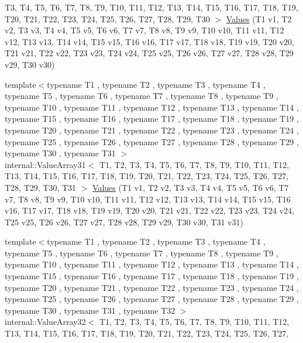 \begin{DoxyCompactItemize}
\-T3, \-T4, \-T5, \-T6, \-T7, \-T8, \-T9, \*
\-T10, \-T11, \-T12, \-T13, \-T14, \-T15, \*
\-T16, \-T17, \-T18, \-T19, \-T20, \-T21, \*
\-T22, \-T23, \-T24, \-T25, \-T26, \-T27, \*
\-T28, \-T29, \-T30 $>$ \hyperlink{namespacetesting_a016767be70ad0412bdbf837bc4d3ca98}{\-Values} (\-T1 v1, \-T2 v2, \-T3 v3, \-T4 v4, \-T5 v5, \-T6 v6, \-T7 v7, \-T8 v8, \-T9 v9, \-T10 v10, \-T11 v11, \-T12 v12, \-T13 v13, \-T14 v14, \-T15 v15, \-T16 v16, \-T17 v17, \-T18 v18, \-T19 v19, \-T20 v20, \-T21 v21, \-T22 v22, \-T23 v23, \-T24 v24, \-T25 v25, \-T26 v26, \-T27 v27, \-T28 v28, \-T29 v29, \-T30 v30)
\item 
{\footnotesize template$<$typename T1 , typename T2 , typename T3 , typename T4 , typename T5 , typename T6 , typename T7 , typename T8 , typename T9 , typename T10 , typename T11 , typename T12 , typename T13 , typename T14 , typename T15 , typename T16 , typename T17 , typename T18 , typename T19 , typename T20 , typename T21 , typename T22 , typename T23 , typename T24 , typename T25 , typename T26 , typename T27 , typename T28 , typename T29 , typename T30 , typename T31 $>$ }\\internal\-::\-Value\-Array31$<$ \-T1, \-T2, \*
\-T3, \-T4, \-T5, \-T6, \-T7, \-T8, \-T9, \*
\-T10, \-T11, \-T12, \-T13, \-T14, \-T15, \*
\-T16, \-T17, \-T18, \-T19, \-T20, \-T21, \*
\-T22, \-T23, \-T24, \-T25, \-T26, \-T27, \*
\-T28, \-T29, \-T30, \-T31 $>$ \hyperlink{namespacetesting_a40d9696e1754455c8329a866c17ed7bb}{\-Values} (\-T1 v1, \-T2 v2, \-T3 v3, \-T4 v4, \-T5 v5, \-T6 v6, \-T7 v7, \-T8 v8, \-T9 v9, \-T10 v10, \-T11 v11, \-T12 v12, \-T13 v13, \-T14 v14, \-T15 v15, \-T16 v16, \-T17 v17, \-T18 v18, \-T19 v19, \-T20 v20, \-T21 v21, \-T22 v22, \-T23 v23, \-T24 v24, \-T25 v25, \-T26 v26, \-T27 v27, \-T28 v28, \-T29 v29, \-T30 v30, \-T31 v31)
\item 
{\footnotesize template$<$typename T1 , typename T2 , typename T3 , typename T4 , typename T5 , typename T6 , typename T7 , typename T8 , typename T9 , typename T10 , typename T11 , typename T12 , typename T13 , typename T14 , typename T15 , typename T16 , typename T17 , typename T18 , typename T19 , typename T20 , typename T21 , typename T22 , typename T23 , typename T24 , typename T25 , typename T26 , typename T27 , typename T28 , typename T29 , typename T30 , typename T31 , typename T32 $>$ }\\internal\-::\-Value\-Array32$<$ \-T1, \-T2, \*
\-T3, \-T4, \-T5, \-T6, \-T7, \-T8, \-T9, \*
\-T10, \-T11, \-T12, \-T13, \-T14, \-T15, \*
\-T16, \-T17, \-T18, \-T19, \-T20, \-T21, \*
\-T22, \-T23, \-T24, \-T25, \-T26, \-T27, \*

\end{DoxyCompactItemize}
